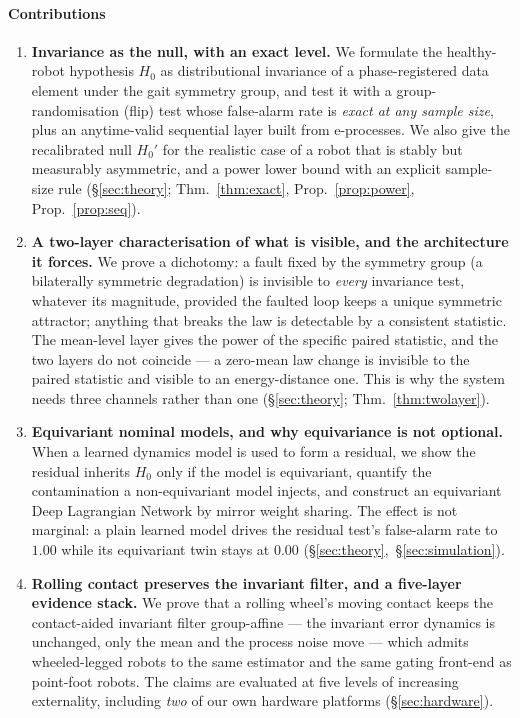 \paragraph{Contributions}
\begin{enumerate}
\item \textbf{Invariance as the null, with an exact level.} We formulate the healthy-robot hypothesis $H_0$ as
  distributional invariance of a phase-registered data element under the gait symmetry group, and test it with a
  group-randomisation (flip) test whose false-alarm rate is \emph{exact at any sample size}, plus an anytime-valid
  sequential layer built from e-processes. We also give the recalibrated null $H_0'$ for the realistic case of a robot
  that is stably but measurably asymmetric, and a power lower bound with an explicit sample-size rule
  (\S\ref{sec:theory}; Thm.~\ref{thm:exact}, Prop.~\ref{prop:power}, Prop.~\ref{prop:seq}).
\item \textbf{A two-layer characterisation of what is visible, and the architecture it forces.} We prove a dichotomy:
  a fault fixed by the symmetry group (a bilaterally symmetric degradation) is invisible to \emph{every} invariance
  test, whatever its magnitude, provided the faulted loop keeps a unique symmetric attractor; anything that breaks the
  law is detectable by a consistent statistic. The mean-level layer gives the power of the specific paired statistic,
  and the two layers do not coincide --- a zero-mean law change is invisible to the paired statistic and visible to an
  energy-distance one. This is why the system needs three channels rather than one
  (\S\ref{sec:theory}; Thm.~\ref{thm:twolayer}).
\item \textbf{Equivariant nominal models, and why equivariance is not optional.} When a learned dynamics model is used
  to form a residual, we show the residual inherits $H_0$ only if the model is equivariant, quantify the contamination
  a non-equivariant model injects, and construct an equivariant Deep Lagrangian Network by mirror weight sharing. The
  effect is not marginal: a plain learned model drives the residual test's false-alarm rate to $1.00$ while its
  equivariant twin stays at $0.00$ (\S\ref{sec:theory},~\S\ref{sec:simulation}).
\item \textbf{Rolling contact preserves the invariant filter, and a five-layer evidence stack.} We prove that a rolling
  wheel's moving contact keeps the contact-aided invariant filter group-affine --- the invariant error dynamics is
  unchanged, only the mean and the process noise move --- which admits wheeled-legged robots to the same estimator and
  the same gating front-end as point-foot robots. The claims are evaluated at five levels of increasing externality,
  including \emph{two} of our own hardware platforms (\S\ref{sec:hardware}).
\end{enumerate}

